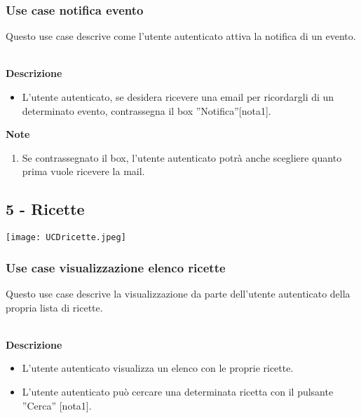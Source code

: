 \documentclass[a4paper,12pt]{article}
\begin{document}
\subsubsection*{Use case notifica evento}

Questo use case descrive come l'utente autenticato attiva la notifica di un evento.

\textbf{\\Descrizione}
\begin{itemize} \setlength\itemsep{0.01em}
\item L'utente autenticato, se desidera ricevere una email per ricordargli di un determinato evento, contrassegna il box ''Notifica''[nota1].
\end{itemize}

\textbf{Note}
\begin{enumerate} \setlength\itemsep{0.01em}
\item Se contrassegnato il box, l'utente autenticato potrà anche scegliere quanto prima vuole ricevere la mail.
\end{enumerate}







\subsection*{5 - Ricette }

\begin{center}
  \texttt{[image: UCDricette.jpeg]}
\end{center}

\subsubsection*{Use case visualizzazione elenco ricette}

Questo use case descrive la visualizzazione da parte dell'utente autenticato della propria lista di ricette.

\textbf{\\Descrizione}
\begin{itemize} \setlength\itemsep{0.01em}
\item L'utente autenticato visualizza un elenco con le proprie ricette.
\item L'utente autenticato può cercare una determinata ricetta con il pulsante ''Cerca'' [nota1].
\end{itemize}
\end{document}

